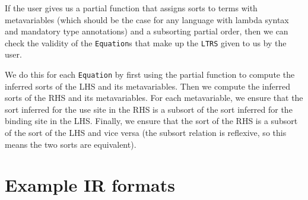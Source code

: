 \documentclass[11pt]{report}
\newcommand{\haskell}[1]{\texttt{#1}}
\newlength{\fixmewidth}
\newcommand{\fixme}[1]{%
  \begin{minipage}[c]{\fixmewidth}%
  \todo[color=green!40,inline]{\textsc{fixme:} #1}%
  \end{minipage}}
\newcommand{\sfixme}[0]{%
  \begin{minipage}[c]{3.5em}%
  \todo[color=green!40,inline]{\textsc{fixme}}%
  \end{minipage}}
\begin{document}

If the user gives us a partial function that assigns sorts to terms with
metavariables (which should be the case for any language with lambda syntax
and mandatory type annotations) and a subsorting partial order, then we can
check the validity of the \haskell{Equation}s that make up the \haskell{LTRS}
given to us by the user.

We do this for each \haskell{Equation} by first using the partial function to
compute the inferred sorts of the LHS and its metavariables. Then we compute the
inferred sorts of the RHS and its metavariables. For each metavariable, we
ensure that the sort inferred for the use site in the RHS is a subsort of the
sort inferred for the binding site in the LHS. Finally, we ensure that the sort
of the RHS is a subsort of the sort of the LHS and vice versa (the subsort
relation is reflexive, so this means the two sorts are equivalent).


%
%
%
%
%
%
%


\chapter{Example IR formats}
\label{sec:example-languages}
\end{document}
